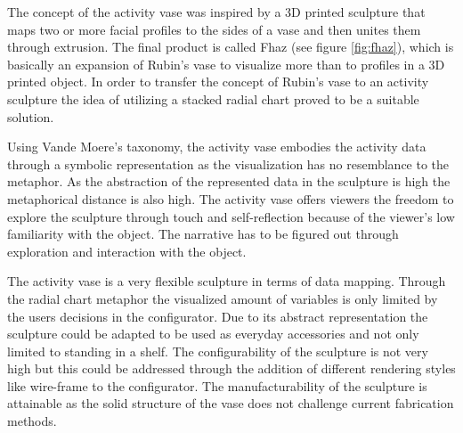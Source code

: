 \documentclass[../medieninformatik-arbeit.tex]{subfiles}
\begin{document}
The concept of the activity vase was inspired by a 3D printed sculpture that maps two or more facial profiles to the sides of a vase and then unites them through extrusion. The final product is called Fhaz (see figure \ref{fig:fhaz}), which is basically an expansion of Rubin's vase\cite{rubin1921visuell} to visualize more than to profiles in a 3D printed object. In order to transfer the concept of Rubin's vase to an activity sculpture the idea of utilizing a stacked radial chart proved to be a suitable solution.

Using Vande Moere's taxonomy, the activity vase embodies the activity data through a symbolic representation as the visualization has no resemblance to the metaphor. As the abstraction of the represented data in the sculpture is high the metaphorical distance is also high. The activity vase offers viewers the freedom to explore the sculpture through touch and self-reflection because of the viewer's low familiarity with the object. The narrative has to be figured out through exploration and interaction with the object.

The activity vase is a very flexible sculpture in terms of data mapping. Through the radial chart metaphor the visualized amount of variables is only limited by the users decisions in the configurator. Due to its abstract representation the sculpture could be adapted to be used as everyday accessories and not only limited to standing in a shelf. The configurability of the sculpture is not very high but this could be addressed through the addition of different rendering styles like wire-frame to the configurator. The manufacturability of the sculpture is attainable as the solid structure of the vase does not challenge current fabrication methods. 
\end{document}
